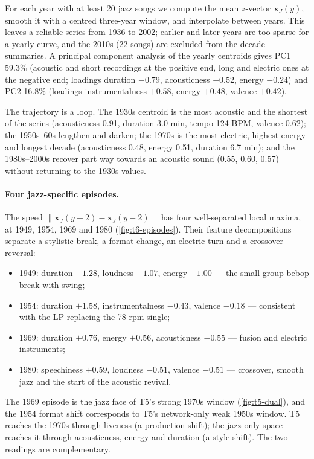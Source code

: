 For each year with at least 20 jazz songs we compute the mean \(z\)-vector
\(\mathbf{x}_J(y)\), smooth it with a centred three-year window, and interpolate between years.
This leaves a reliable series from 1936 to 2002; earlier and later years are too sparse
for a yearly curve, and the 2010s (22 songs) are excluded from the decade summaries. A principal
component analysis of the yearly centroids gives PC1 59.3\% (acoustic and short recordings at
the positive end, long and electric ones at the negative end; loadings duration $-0.79$, acousticness $+0.52$, energy $-0.24$) and PC2
16.8\% (loadings instrumentalness $+0.58$, energy $+0.48$, valence $+0.42$).

The trajectory is a loop. The 1930s centroid is the most acoustic and the shortest of the series
(acousticness 0.91, duration 3.0 min, tempo 124 BPM, valence
0.62); the 1950s--60s lengthen and darken; the 1970s is the most electric, highest-energy
and longest decade (acousticness 0.48, energy 0.51, duration 6.7 min); and
the 1980s--2000s recover part way towards an acoustic sound (0.55, 0.60,
0.57) without returning to the 1930s values.

\paragraph{Four jazz-specific episodes.}
The speed \(\|\mathbf{x}_J(y+2)-\mathbf{x}_J(y-2)\|\) has four well-separated local maxima, at
1949, 1954, 1969 and 1980 (\cref{fig:t6-episodes}). Their feature decompositions separate a stylistic break, a
format change, an electric turn and a crossover reversal:
\begin{itemize}[leftmargin=1.2em,itemsep=0.15em]
\item 1949: duration $-1.28$, loudness $-1.07$, energy $-1.00$ --- the small-group bebop break with swing;
\item 1954: duration $+1.58$, instrumentalness $-0.43$, valence $-0.18$ --- consistent with the LP replacing the 78-rpm single;
\item 1969: duration $+0.76$, energy $+0.56$, acousticness $-0.55$ --- fusion and electric instruments;
\item 1980: speechiness $+0.59$, loudness $-0.51$, valence $-0.51$ --- crossover, smooth jazz and the start of the acoustic revival.
\end{itemize}
The 1969 episode is the jazz face of T5's strong 1970s window (\cref{fig:t5-dual}), and the 1954
format shift corresponds to T5's network-only weak 1950s window. T5 reaches the 1970s through
liveness (a production shift); the jazz-only space reaches it through acousticness, energy and
duration (a style shift). The two readings are complementary.

